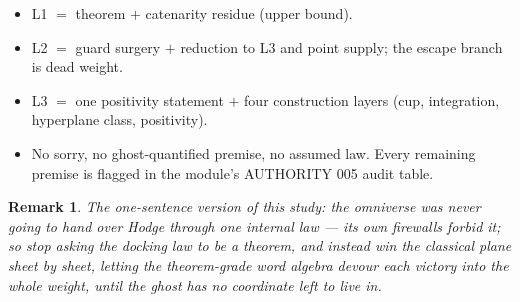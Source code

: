 \documentclass[11pt]{article}
\renewcommand{\_}{\textunderscore\allowbreak}
\newtheorem{remark}[definition]{Remark}
\begin{document}
\begin{itemize}[leftmargin=2em]
\item L1 $=$ theorem $+$ catenarity residue (upper bound).
\item L2 $=$ guard surgery $+$ reduction to L3 and point supply; the escape
branch is dead weight.
\item L3 $=$ one positivity statement $+$ four construction layers (cup,
integration, hyperplane class, positivity).
\item No sorry, no ghost-quantified premise, no assumed law. Every remaining
premise is flagged in the module's AUTHORITY 005 audit table.
\end{itemize}

\begin{remark}
The one-sentence version of this study: \emph{the omniverse was never going
to hand over Hodge through one internal law --- its own firewalls forbid it;
so stop asking the docking law to be a theorem, and instead win the classical
plane sheet by sheet, letting the theorem-grade word algebra devour each
victory into the whole weight, until the ghost has no coordinate left to live
in.}
\end{remark}
\end{document}
